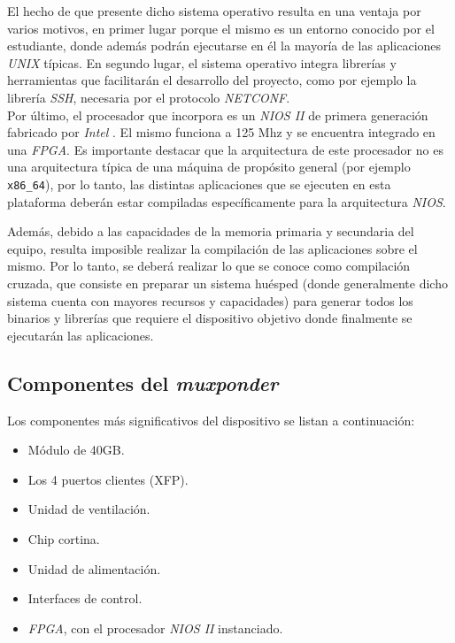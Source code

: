 El hecho de que presente dicho sistema operativo resulta en una ventaja por varios motivos, en primer lugar porque el mismo es un entorno conocido por el estudiante, donde además podrán ejecutarse en él la mayoría de las aplicaciones \textit{UNIX} típicas. En segundo lugar, el sistema operativo integra librerías y herramientas que facilitarán el desarrollo del proyecto, como por ejemplo la librería \textit{SSH}, necesaria por el protocolo \textit{NETCONF}.
\\

Por último, el procesador que incorpora es un \textit{NIOS II} de primera generación fabricado por \textit{Intel} \parencite{intelaltera}. El mismo funciona a 125 Mhz y se encuentra integrado en una \textit{FPGA}. Es importante destacar que la arquitectura de este procesador no es una arquitectura típica de una máquina de propósito general (por ejemplo \texttt{x86\_64}), por lo tanto, las distintas aplicaciones que se ejecuten en esta plataforma deberán estar compiladas específicamente para la arquitectura \textit{NIOS}. 

Además, debido a las capacidades de la memoria primaria y secundaria del equipo, resulta imposible realizar la compilación de las aplicaciones sobre el mismo. Por lo tanto, se deberá realizar lo que se conoce como compilación cruzada, que consiste en preparar un sistema huésped (donde generalmente dicho sistema cuenta con mayores recursos y capacidades) para generar todos los binarios y librerías que requiere el dispositivo objetivo donde finalmente se ejecutarán las aplicaciones.

\newpage

\subsection{Componentes del \textit{muxponder}}

Los componentes más significativos del dispositivo se listan a continuación:

\begin{itemize}
	\item Módulo de 40GB.
	\item Los 4 puertos clientes (XFP).
	\item Unidad de ventilación.
	\item Chip cortina.
	\item Unidad de alimentación.
	\item Interfaces de control.
	\item \textit{FPGA}, con el procesador \textit{NIOS II} instanciado.
\end{itemize}


